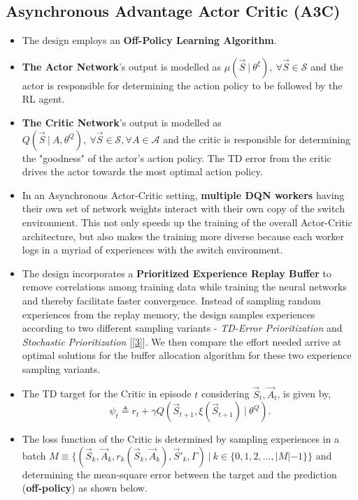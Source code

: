 \documentclass{article}
\begin{document}
\subsection{Asynchronous Advantage Actor Critic (A3C)}
\begin{itemize}
    \item The design employs an \textbf{Off-Policy Learning Algorithm}.
    \item \textbf{The Actor Network}'s output is modelled as $\mu(\vec{S}\ |\ \theta^{\xi}),\ \forall \vec{S} \in \mathcal{S}$ and the actor is responsible for determining the action policy to be followed by the RL agent.
    \item \textbf{The Critic Network}'s output is modelled as $Q(\vec{S}\ |\ A, \theta^{Q}),\ \forall \vec{S} \in \mathcal{S}, \forall A \in \mathcal{A}$ and the critic is responsible for determining the "goodness" of the actor's action policy. The TD error from the critic drives the actor towards the most optimal action policy.
    \item In an Asynchronous Actor-Critic setting, \textbf{multiple DQN workers} having their own set of network weights interact with their own copy of the switch environment. This not only speeds up the training of the overall Actor-Critic architecture, but also makes the training more diverse because each worker logs in a myriad of experiences with the switch environment.
    \item The design incorporates a \textbf{Prioritized Experience Replay Buffer} to remove correlations among training data while training the neural networks and thereby facilitate faster convergence. Instead of sampling random experiences from the replay memory, the design samples experiences according to two different sampling variants - \textit{TD-Error Prioritization} and \textit{Stochastic Prioritization} [\ref{3}]. We then compare the effort needed arrive at optimal solutions for the buffer allocation algorithm for these two experience sampling variants.
    \item The TD target for the Critic in episode $t$ considering $\vec{S}_t, \vec{A}_t$, is given by,
    \begin{equation}
        \psi_{t} \triangleq r_t + \gamma Q(\vec{S}_{t+1}, \xi(\vec{S}_{t+1})\ |\ \theta^{Q}).
    \end{equation}
    \item The loss function of the Critic is determined by sampling experiences in a batch $M \equiv \{(\vec{S}_{k}, \vec{A}_{k}, r_{k}(\vec{S}_{k}, \vec{A}_{k}), \vec{S}'_{k}, \Gamma)\ |\ k \in \{0, 1, 2, \dots, |M| - 1\}\}$ and determining the mean-square error between the target and the prediction (\textbf{off-policy}) as shown below.

\end{itemize}
\end{document}
